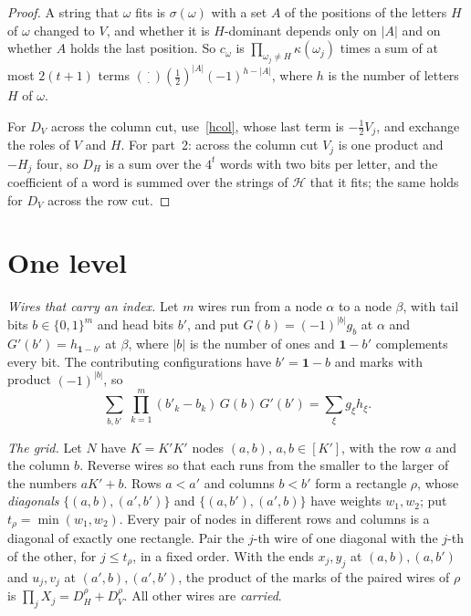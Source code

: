 \documentclass[10pt]{article}
\newcommand{\Hs}{\mathcal H}
\begin{document}
\begin{proof}
A string that $\omega$ fits is $\sigma(\omega)$ with a set $A$ of the positions of the letters $H$ of $\omega$ changed to $V$, and whether it is $H$-dominant depends only on $|A|$ and on whether $A$ holds the last position. So $c_\omega$ is $\prod_{\omega_j\ne H}\kappa(\omega_j)$ times a sum of at most $2(t+1)$ terms $\binom{\cdot}{\cdot}(\frac12)^{|A|}(-1)^{h-|A|}$, where $h$ is the number of letters $H$ of $\omega$.

For $D_V$ across the column cut, use~\eqref{hcol}, whose last term is $-\frac12V_j$, and exchange the roles of $V$ and $H$. For part~2: across the column cut $V_j$ is one product and $-H_j$ four, so $D_H$ is a sum over the $4^t$ words with two bits per letter, and the coefficient of a word is summed over the strings of $\Hs$ that it fits; the same holds for $D_V$ across the row cut.
\end{proof}

\section{One level}

\emph{Wires that carry an index.} Let $m$ wires run from a node $\alpha$ to a node $\beta$, with tail bits $b\in\{0,1\}^m$ and head bits $b'$, and put $G(b)=(-1)^{|b|}g_b$ at $\alpha$ and $G'(b')=h_{\mathbf1-b'}$ at $\beta$, where $|b|$ is the number of ones and $\mathbf1-b'$ complements every bit. The contributing configurations have $b'=\mathbf1-b$ and marks with product $(-1)^{|b|}$, so
\begin{equation}\label{index}
\sum_{b,b'}\ \prod_{k=1}^m(b'_k-b_k)\,G(b)\,G'(b')=\sum_\xi g_\xi h_\xi .
\end{equation}

\emph{The grid.} Let $N$ have $K=K'K'$ nodes $(a,b)$, $a,b\in[K']$, with the row $a$ and the column $b$. Reverse wires so that each runs from the smaller to the larger of the numbers $aK'+b$. Rows $a<a'$ and columns $b<b'$ form a rectangle $\rho$, whose \emph{diagonals} $\{(a,b),(a',b')\}$ and $\{(a,b'),(a',b)\}$ have weights $w_1,w_2$; put $t_\rho=\min(w_1,w_2)$. Every pair of nodes in different rows and columns is a diagonal of exactly one rectangle. Pair the $j$-th wire of one diagonal with the $j$-th of the other, for $j\le t_\rho$, in a fixed order. With the ends $x_j,y_j$ at $(a,b),(a,b')$ and $u_j,v_j$ at $(a',b),(a',b')$, the product of the marks of the paired wires of $\rho$ is $\prod_jX_j=D_H^\rho+D_V^\rho$. All other wires are \emph{carried}.
\end{document}
